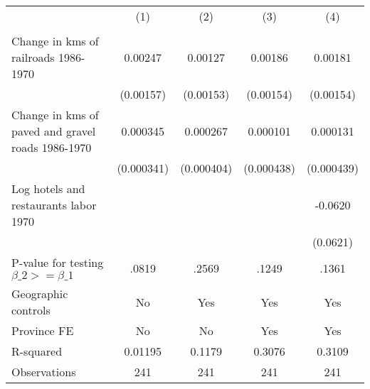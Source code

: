 {
\def\sym#1{\ifmmode^{#1}\else\(^{#1}\)\fi}
\begin{tabular}{l*{4}{c}}
\hline\hline
                &\multicolumn{1}{c}{(1)}&\multicolumn{1}{c}{(2)}&\multicolumn{1}{c}{(3)}&\multicolumn{1}{c}{(4)}\\
                &\multicolumn{1}{c}{}&\multicolumn{1}{c}{}&\multicolumn{1}{c}{}&\multicolumn{1}{c}{}\\
\hline
Change in kms of railroads 1986-1970&  0.00247         &  0.00127         &  0.00186         &  0.00181         \\
                &(0.00157)         &(0.00153)         &(0.00154)         &(0.00154)         \\
[1em]
Change in kms of paved and gravel roads 1986-1970& 0.000345         & 0.000267         & 0.000101         & 0.000131         \\
                &(0.000341)         &(0.000404)         &(0.000438)         &(0.000439)         \\
[1em]
Log hotels and restaurants labor 1970&                  &                  &                  &  -0.0620         \\
                &                  &                  &                  & (0.0621)         \\
\hline
P-value for testing $\beta\_{2} >= \beta\_{1}$&    .0819         &    .2569         &    .1249         &    .1361         \\
Geographic controls&       No         &      Yes         &      Yes         &      Yes         \\
Province FE     &       No         &       No         &      Yes         &      Yes         \\
R-squared       &  0.01195         &   0.1179         &   0.3076         &   0.3109         \\
Observations    &      241         &      241         &      241         &      241         \\
\hline\hline
\end{tabular}
}
